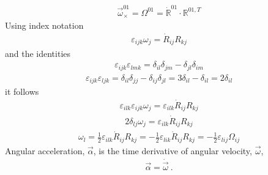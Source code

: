 \documentclass[letterpaper,10pt,english]{jupyterBook}
\begin{document}
\sphinxAtStartPar
{}
\begin{equation*}
\begin{split}\vec{\omega}^{01}_{\times} = \mathbb{\Omega}^{01} = \dot{\mathbb{R}}^{01} \cdot \mathbb{R}^{01,T}\end{split}
\end{equation*}
\sphinxAtStartPar
Using index notation
\begin{equation*}
\begin{split}\varepsilon_{ijk} \omega_j = \dot{R}_{ij} R_{kj}\end{split}
\end{equation*}
\sphinxAtStartPar
and the identities
\begin{equation*}
\begin{split}\varepsilon_{ijk} \varepsilon_{lmk} = \delta_{il} \delta_{jm} - \delta_{jl} \delta_{im}\end{split}
\end{equation*}\begin{equation*}
\begin{split}\varepsilon_{ijk} \varepsilon_{ljk} = \delta_{il} \delta_{jj} - \delta_{ij} \delta_{jl} = 3 \delta_{il} - \delta_{il} = 2 \delta_{il}\end{split}
\end{equation*}
\sphinxAtStartPar
it follows
\begin{equation*}
\begin{split}\varepsilon_{ilk} \varepsilon_{ijk} \omega_j = \varepsilon_{ilk} \dot{R}_{ij} R_{kj}\end{split}
\end{equation*}\begin{equation*}
\begin{split}2 \delta_{lj} \omega_j = \varepsilon_{ilk} \dot{R}_{ij} R_{kj}\end{split}
\end{equation*}\begin{equation*}
\begin{split}\omega_l = \frac{1}{2} \varepsilon_{ilk} \dot{R}_{ij} R_{kj} = - \frac{1}{2} \varepsilon_{lik} \dot{R}_{ij} R_{kj} = -\frac{1}{2} \varepsilon_{lij} \Omega_{ij}\end{split}
\end{equation*}
\sphinxAtStartPar
{} Angular acceleration, \(\vec{\alpha}\), is the time derivative of angular velocity, \(\vec{\omega}\),
\begin{equation*}
\begin{split}\vec{\alpha} = \dot{\vec{\omega}} \ .\end{split}
\end{equation*}
\end{document}
